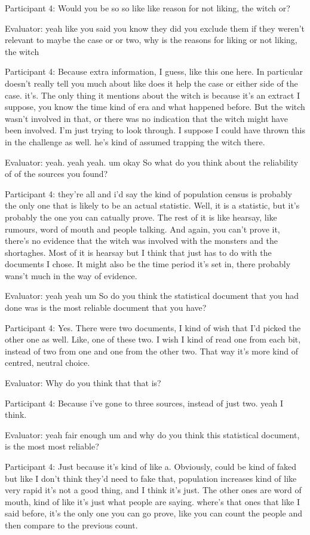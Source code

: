\documentclass{l4proj}
\begin{document}
\begin{appendices}
Participant 4: Would you be so so like like reason for not liking, the witch or?

Evaluator: yeah like you said you know they did you exclude them if they weren't relevant to maybe the case or or two, why is the reasons for liking or not liking, the witch

Participant 4: Because extra information, I guess, like this one here. In particular doesn't really tell you much about like does it help the case or either side of the case. it's. The only thing it mentions about the witch is because it's an extract I suppose, you know the time kind of era and what happened before. But the witch wasn’t involved in that, or there was no indication that the witch might have been involved. I’m just trying to look through. I
suppose I could have thrown this in the challenge as well. he's kind of assumed trapping the witch there. 

Evaluator: yeah. yeah yeah. um okay So what do you think about the reliability of of the sources you found?

Participant 4: they're all and i'd say the kind of population census is probably the only one that is likely to be an actual statistic. Well, it is a statistic, but it’s probably the one you can catually prove. The rest of it is like hearsay, like rumours, word of mouth and people talking. And again, you can’t prove it, there’s no evidence that the witch was involved with the monsters and the shortaghes. Most of it is hearsay but I think that just has to do with the documents I chose. It might also be the time period it’s set in, there probably wans’t much in the way of evidence.

Evaluator: yeah yeah um So do you think the statistical document that you had done was is the most reliable document that you have?

Participant 4: Yes. There were two documents, I kind of wish that I’d picked the other one as well. Like, one of these two. I wish I kind of read one from each bit, instead of two from one and one from the other two. That way it’s more kind of centred, neutral choice.

Evaluator: Why do you think that that is?

Participant 4: Because i've gone to three sources, instead of just two. yeah I think.

Evaluator: yeah fair enough um and why do you think this statistical document, is the most most reliable?

Participant 4: Just because it's kind of like a. Obviously, could be kind of faked but like I don't think they’d need to fake that, population increases kind of like very rapid it's not a good thing, and I think it's just. The other ones are word of mouth, kind of like it's just what people are saying. where's that ones that like I said before, it's the only one you can go prove, like you can count the people and then compare to the previous count.


\end{appendices}
\end{document}
